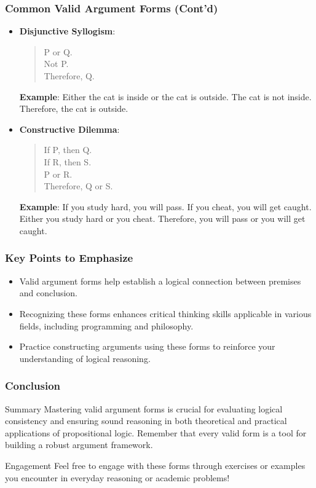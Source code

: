 \documentclass[aspectratio=169]{beamer}
\begin{document}
\begin{frame}[fragile]
    \frametitle{Common Valid Argument Forms (Cont'd)}
    \begin{itemize}
        \item \textbf{Disjunctive Syllogism}:
        \begin{quote}
            P or Q.\\
            Not P.\\
            Therefore, Q.
        \end{quote}
        \textbf{Example}: Either the cat is inside or the cat is outside. The cat is not inside. Therefore, the cat is outside.

        \item \textbf{Constructive Dilemma}:
        \begin{quote}
            If P, then Q.\\
            If R, then S.\\
            P or R.\\
            Therefore, Q or S.
        \end{quote}
        \textbf{Example}: If you study hard, you will pass. If you cheat, you will get caught. Either you study hard or you cheat. Therefore, you will pass or you will get caught.
    \end{itemize}
\end{frame}

\begin{frame}[fragile]
    \frametitle{Key Points to Emphasize}
    \begin{itemize}
        \item Valid argument forms help establish a logical connection between premises and conclusion.
        \item Recognizing these forms enhances critical thinking skills applicable in various fields, including programming and philosophy.
        \item Practice constructing arguments using these forms to reinforce your understanding of logical reasoning.
    \end{itemize}
\end{frame}

\begin{frame}[fragile]
    \frametitle{Conclusion}
    \begin{block}{Summary}
        Mastering valid argument forms is crucial for evaluating logical consistency and ensuring sound reasoning in both theoretical and practical applications of propositional logic. Remember that every valid form is a tool for building a robust argument framework.
    \end{block}
    
    \begin{block}{Engagement}
        Feel free to engage with these forms through exercises or examples you encounter in everyday reasoning or academic problems!
    \end{block}
\end{frame}
\end{document}

